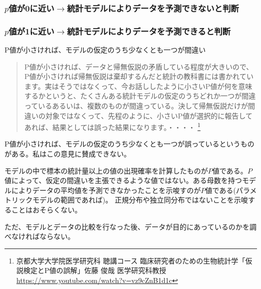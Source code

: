 \subsubsection{$p$値が0に近い$\rightarrow$統計モデルによりデータを予測できないと判断}

\subsubsection{$p$値が1に近い$\rightarrow$統計モデルによりデータを予測できると判断}




\begin{SMbox}{P値が小さければ、モデルの仮定のうち少なくとも一つが間違い}
    \ 
    \begin{quote}
        P値が小さければ、データと帰無仮説の矛盾している程度が大きいので、P値が小さければ帰無仮説は棄却するんだと統計の教科書には書かれています。実はそうではなくって、今お話ししたように小さいP値が何を意味するかというと、たくさんある統計モデルの仮定のうちどれか一つが間違っているあるいは、複数のものが間違っている。決して帰無仮説だけが間違いの対象ではなくって、先程のように、小さいP値が選択的に報告してあれば、結果としては誤った結果になります。・・・・
        \footnote{京都大学大学院医学研究科 聴講コース 臨床研究者のための生物統計学「仮説検定とP値の誤解」佐藤 俊哉 医学研究科教授 \url{https://www.youtube.com/watch?v=vz9cZnB1d1c} }
    \end{quote}
    P値が小さければ、モデルの仮定のうち少なくとも一つが誤っているというものがある。私はこの意見に賛成できない。

    モデルの中で標本の統計量以上の値の出現確率を計算したものが$P$値である。$P$値によって、仮定の間違いを主張できるような値ではない。ある母数を持つモデルによりデータの平均値を予測できなかったことを示唆すのが$P$値である(パラメトリックモデルの範囲であれば)。
    正規分布や独立同分布ではないことを示唆することはおそらくない。

    ただ、モデルとデータの比較を行なった後、データが目的にあっているのかを調べなければならない。
\end{SMbox}


